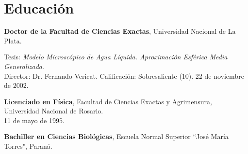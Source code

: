 
\hrulefill \vspace{-1.5em}
\section*{Educación}

\begin{timeline}
 \textbf{Doctor de la Facultad de Ciencias Exactas}, Universidad Nacional de La Plata.

Tesis: \emph{Modelo Microscópico de Agua Líquida. Aproximación Esférica Media Generalizada}. \\Director: Dr. Fernando Vericat. Calificación: Sobresaliente  (10). 22 de noviembre de 2002.

 \textbf{Licenciado en Física}, Facultad de Ciencias Exactas y Agrimensura, Universidad Nacional de Rosario. \\11 de mayo de 1995.

 \textbf{Bachiller en Ciencias Biológicas}, Escuela Normal Superior ``José María Torres", Paraná.
\end{timeline}